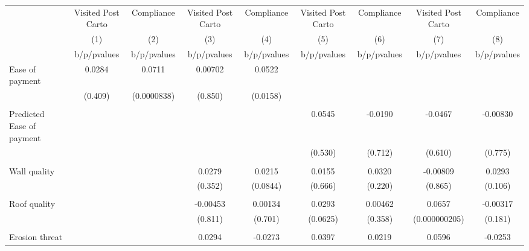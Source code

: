{
\def\sym#1{\ifmmode^{#1}\else\(^{#1}\)\fi}
\begin{tabular}{l*{8}{c}}
\toprule
                &\multicolumn{1}{c}{Visited Post Carto}&\multicolumn{1}{c}{Compliance}&\multicolumn{1}{c}{Visited Post Carto}&\multicolumn{1}{c}{Compliance}&\multicolumn{1}{c}{Visited Post Carto}&\multicolumn{1}{c}{Compliance}&\multicolumn{1}{c}{Visited Post Carto}&\multicolumn{1}{c}{Compliance}\\
                &\multicolumn{1}{c}{(1)}&\multicolumn{1}{c}{(2)}&\multicolumn{1}{c}{(3)}&\multicolumn{1}{c}{(4)}&\multicolumn{1}{c}{(5)}&\multicolumn{1}{c}{(6)}&\multicolumn{1}{c}{(7)}&\multicolumn{1}{c}{(8)}\\
                &b/p/pvalues&b/p/pvalues&b/p/pvalues&b/p/pvalues&b/p/pvalues&b/p/pvalues&b/p/pvalues&b/p/pvalues\\
\midrule
Ease of payment &   0.0284&   0.0711&  0.00702&   0.0522&         &         &         &         \\
                &  (0.409)&(0.0000838)&  (0.850)& (0.0158)&         &         &         &         \\
                &         &         &         &         &         &         &         &         \\
Predicted Ease of payment&         &         &         &         &   0.0545&  -0.0190&  -0.0467& -0.00830\\
                &         &         &         &         &  (0.530)&  (0.712)&  (0.610)&  (0.775)\\
                &         &         &         &         &         &         &         &         \\
Wall quality    &         &         &   0.0279&   0.0215&   0.0155&   0.0320& -0.00809&   0.0293\\
                &         &         &  (0.352)& (0.0844)&  (0.666)&  (0.220)&  (0.865)&  (0.106)\\
                &         &         &         &         &         &         &         &         \\
Roof quality    &         &         & -0.00453&  0.00134&   0.0293&  0.00462&   0.0657& -0.00317\\
                &         &         &  (0.811)&  (0.701)& (0.0625)&  (0.358)&(0.000000205)&  (0.181)\\
                &         &         &         &         &         &         &         &         \\
Erosion threat  &         &         &   0.0294&  -0.0273&   0.0397&   0.0219&   0.0596&  -0.0253\\

\end{tabular}}
